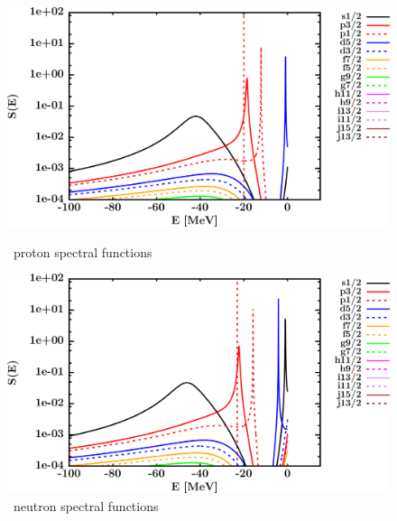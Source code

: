 \begin{figure}[hbtp]
    \centering
    \begin{minipage}{0.42\textwidth}
        \centering
        \includegraphics[width=\textwidth]{figures/o16_protonSpectralFunctions.png}
        \caption*{\oSix\ proton spectral functions}
        \label{DOMFitData_o16_proton_spectralFunctions}
    \end{minipage}\hspace{6pt}
    \begin{minipage}{0.42\textwidth}
        \centering
        \includegraphics[width=\linewidth]{figures/o16_neutronSpectralFunctions.png}
        \caption*{\oSix\ neutron spectral functions}
        \label{DOMFitData_o16_neutron_spectralFunctions}
    \end{minipage}
\end{figure}
